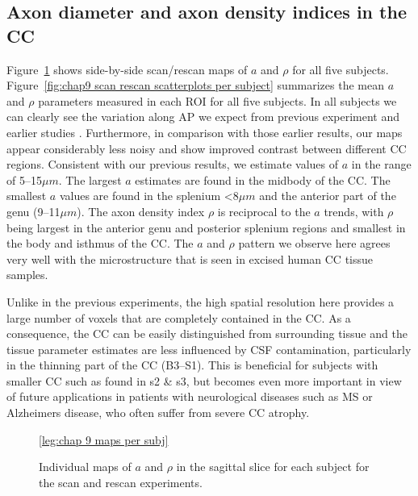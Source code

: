 \subsection{Axon diameter and axon density indices in the CC}
Figure~\ref{fig:chap9 scan rescan maps per subject} shows side-by-side scan/rescan maps of $a$ and $\rho$ for all five subjects. Figure~\ref{fig:chap9 scan rescan scatterplots per subject} summarizes the mean $a$ and $\rho$ parameters measured in each ROI for all five subjects. In all subjects we can clearly see the variation along AP we expect from previous experiment and earlier studies \citep{Alexander:2010}. Furthermore, in comparison with those earlier results, our maps appear considerably less noisy and show improved contrast between different CC regions. Consistent with our previous results, we estimate values of $a$ in the range of 5--15$\mu m$. The largest $a$ estimates are found in the midbody of the CC. The smallest $a$ values are found in the splenium <8$\mu m$ and the anterior part of the genu (9--11$\mu m$). The axon density index $\rho$ is reciprocal to the $a$ trends, with $\rho$ being largest in the anterior genu and posterior splenium regions and smallest in the body and isthmus of the CC. The $a$ and $\rho$ pattern we observe here agrees very well with the microstructure that is seen in excised human CC tissue samples.


Unlike in the previous experiments, the high spatial resolution here provides a large number of voxels that are completely contained in the CC. As a consequence, the CC can be easily distinguished from surrounding tissue and the tissue parameter estimates are less influenced by CSF contamination, particularly in the thinning part of the CC (B3--S1). This is beneficial for subjects with smaller CC such as found in s2 \& s3, but becomes even more important in view of future applications in patients with neurological diseases such as MS or Alzheimers disease, who often suffer from severe CC atrophy. 
\begin{figure}[ht]
	\centering
 	\ref{leg:chap 9 maps per subj}
	\caption{Individual maps of $a$ and $\rho$ in the sagittal slice for each subject for the scan and rescan experiments.}
	\label{fig:chap9 scan rescan maps per subject}
\end{figure}

